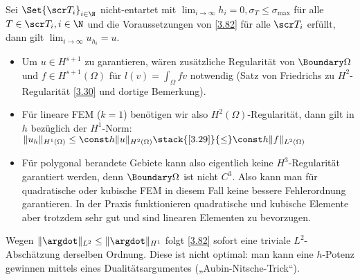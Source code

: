 \begin{kor} \label{3.83}
	Sei $\Set{\scr T_i}_{i\in \N}$ nicht-entartet mit $\lim_{i \to \infty} h_i = 0, \sigma_T \le \sigma_{\text{max}}$ für alle $T \in \scr T_i, i \in \N$ und die Voraussetzungen von \ref{3.82} für alle $\scr T_i$ erfüllt, dann gilt
	\begin{math}
		\lim_{i \to \infty} u_{h_i} = u.
	\end{math}
	\begin{note}
		\begin{itemize}
			\item
				Um $u \in H^{s+1}$ zu garantieren, wären zusätzliche Regularität von $\Boundary \Omega$ und $f \in H^{s+1}(\Omega)$ für $l(v) = \int_\Omega f v$ notwendig (Satz von Friedrichs zu $H^2$-Regularität \ref{3.30} und dortige Bemerkung).
			\item
				Für lineare FEM ($k = 1$) benötigen wir also $H^2(\Omega)$-Regularität, dann gilt  in $h$ bezüglich der $H^1$-Norm:
				\begin{math}
					\|u_h\|_{H^1(\Omega)} \le \const h \|u\|_{H^2(\Omega)}
					\stack{\ref{3.29}}{\le} \const h \|f\|_{L^2(\Omega)}
				\end{math}
			\item
				Für polygonal berandete Gebiete kann also eigentlich keine $H^3$-Regularität garantiert werden, denn $\Boundary \Omega$ ist nicht $C^3$.
				Also kann man für quadratische oder kubische FEM in diesem Fall keine bessere Fehlerordnung garantieren.
				In der Praxis funktionieren quadratische und kubische Elemente aber trotzdem sehr gut und sind linearen Elementen zu bevorzugen.
		\end{itemize}
	\end{note}
\end{kor}


Wegen $\|\argdot\|_{L^2} \le \|\argdot\|_{H^1}$ folgt \ref{3.82} sofort eine triviale $L^2$-Abschätzung derselben Ordnung.
Diese ist nicht optimal: man kann eine $h$-Potenz gewinnen mittels eines Dualitätsargumentes („Aubin-Nitsche-Trick“).

